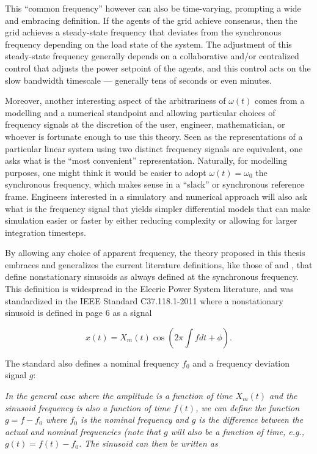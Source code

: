 	This ``common frequency'' however can also be time-varying, prompting a wide and embracing definition. If the agents of the grid achieve consensus, then the grid achieves a steady-state frequency that deviates from the synchronous frequency depending on the load state of the system. The adjustment of this steady-state frequency generally depends on a collaborative and/or centralized control that adjusts the power setpoint of the agents, and this control acts on the slow bandwidth timescale — generally tens of seconds or even minutes. 

	Moreover, another interesting aspect of the arbitrariness of $\omega(t)$ comes from a modelling and a numerical standpoint and allowing particular choices of frequency signals at the discretion of the user, engineer, mathematician, or whoever is fortunate enough to use this theory. Seen as the representations of a particular linear system using two distinct frequency signals are equivalent, one asks what is the ``most convenient'' representation. Naturally, for modelling purposes, one might think it would be easier to adopt $\omega(t) = \omega_0$ the synchronous frequency, which makes sense in a ``slack'' or synchronous reference frame. Engineers interested in a simulatory and numerical approach will also ask what is the frequency signal that yields simpler differential models that can make simulation easier or faster by either reducing complexity or allowing for larger integration timesteps.

	By allowing any choice of apparent frequency, the theory proposed in this thesis embraces and generalizes the current literature definitions, like those of \cite{laraRevisitingPowerSystems2024} and \cite{Venkatasubramanian1994}, that define nonstationary sinusoids as always defined at the synchronous frequency. This definition is widespread in the Elecric Power System literature, and was standardized in the IEEE Standard C37.118.1-2011 where a nonstationary sinusoid is defined in page 6 as a signal 

\begin{equation} x(t) = X_m(t) \cos\left(2\pi \int f dt + \phi\right).\end{equation}

	The standard also defines a nominal frequency $f_0$ and a frequency deviation signal $g$:

	\textit{In the general case where the amplitude is a function of time $X_m(t)$ and the sinusoid frequency is also a function of time $f(t)$, we can define the function $g = f - f_0$ where $f_0$ is the nominal frequency and $g$ is the difference between the actual and nominal frequencies (note that $g$ will also be a function of time, e.g., $g(t) = f(t) - f_0$. The sinusoid can then be written as}

